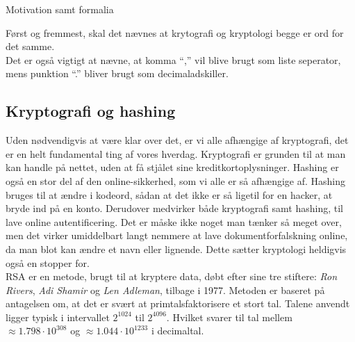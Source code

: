 Motivation samt formalia

Først og fremmest, skal det nævnes at krytografi og kryptologi begge er ord for det samme.\\
Det er også vigtigt at nævne, at komma ``,'' vil blive brugt som liste seperator, mens punktion ``.'' bliver brugt som decimaladskiller.

\subsection*{Kryptografi og hashing}
Uden nødvendigvis at være klar over det, er vi alle afhængige af kryptografi, det er en helt fundamental ting af vores hverdag.
Kryptografi er grunden til at man kan handle på nettet, uden at få stjålet sine kreditkortoplysninger.
Hashing er også en stor del af den online-sikkerhed, som vi alle er så afhængige af.
Hashing bruges til at ændre i kodeord, sådan at det ikke er så ligetil for en hacker, at bryde ind på en konto.
Derudover medvirker både kryptografi samt hashing, til lave online autentificering. Det er måske ikke noget man tænker så meget over, men det virker umiddelbart langt nemmere at lave dokumentforfalskning online, da man blot kan ændre et navn eller lignende. Dette sætter kryptologi heldigvis også en stopper for.
\\



RSA er en metode, brugt til at kryptere data, døbt efter sine tre stiftere:
\textit{Ron Rivers}, \textit{Adi Shamir} og \textit{Len Adleman}, tilbage i 1977.\cite{algoritmer}
Metoden er baseret på antagelsen om, at det er svært at primtalsfaktorisere et stort tal.
Talene anvendt ligger typisk i intervallet \(2^{1024}\) til \(2^{4096}\).
Hvilket svarer til tal mellem \(\approx 1.798 \cdot 10^{308}\) og \(\approx 1.044 \cdot 10^{1233}\) i decimaltal. %
